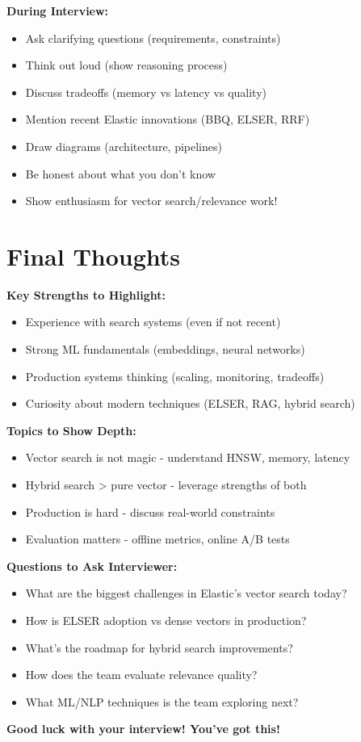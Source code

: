 \documentclass[10pt]{article}
\begin{document}
\textbf{During Interview:}
\begin{itemize}[label=$\square$]
\item Ask clarifying questions (requirements, constraints)
\item Think out loud (show reasoning process)
\item Discuss tradeoffs (memory vs latency vs quality)
\item Mention recent Elastic innovations (BBQ, ELSER, RRF)
\item Draw diagrams (architecture, pipelines)
\item Be honest about what you don't know
\item Show enthusiasm for vector search/relevance work!
\end{itemize}

\section{Final Thoughts}

\textbf{Key Strengths to Highlight:}
\begin{itemize}
\item Experience with search systems (even if not recent)
\item Strong ML fundamentals (embeddings, neural networks)
\item Production systems thinking (scaling, monitoring, tradeoffs)
\item Curiosity about modern techniques (ELSER, RAG, hybrid search)
\end{itemize}

\textbf{Topics to Show Depth:}
\begin{itemize}
\item Vector search is not magic - understand HNSW, memory, latency
\item Hybrid search > pure vector - leverage strengths of both
\item Production is hard - discuss real-world constraints
\item Evaluation matters - offline metrics, online A/B tests
\end{itemize}

\textbf{Questions to Ask Interviewer:}
\begin{itemize}
\item What are the biggest challenges in Elastic's vector search today?
\item How is ELSER adoption vs dense vectors in production?
\item What's the roadmap for hybrid search improvements?
\item How does the team evaluate relevance quality?
\item What ML/NLP techniques is the team exploring next?
\end{itemize}

\vspace{1em}
\noindent\textbf{Good luck with your interview! You've got this! 🚀}
\end{document}
